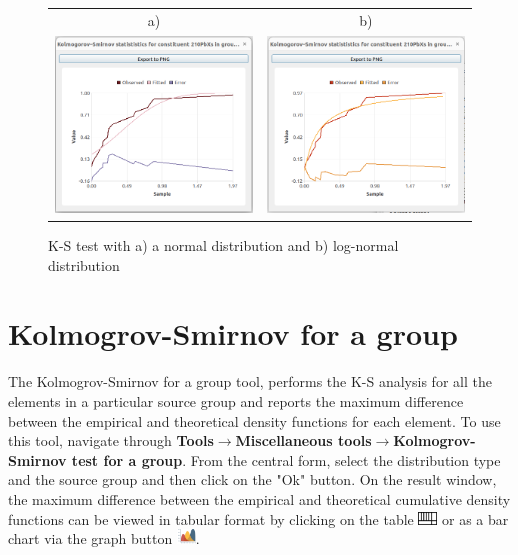 \documentclass[12pt]{report}
\begin{document}
\begin{figure}[ht]
    \centering
    \begin{tabular}{c c}
        a) & b) \\
        \includegraphics[width=8cm]{Figures/K-S-normal.png} & \includegraphics[width=8cm]{Figures/K-S-Lognormal.png}\\
    \end{tabular}
    \caption{K-S test with a) a normal distribution and b) log-normal distribution}
    \label{fig:K-S-test}
\end{figure}
\FloatBarrier


\section{Kolmogrov-Smirnov for a group}
The Kolmogrov-Smirnov for a group tool, performs the K-S analysis for all the elements in a particular source group and reports the maximum difference between the empirical and theoretical density functions for each element. To use this tool, navigate through \textbf{Tools}$\rightarrow$\textbf{Miscellaneous tools}$\rightarrow$\textbf{Kolmogrov-Smirnov test for a group}. From the central form, select the distribution type and the source group and then click on the "Ok" button. On the result window, the maximum difference between the empirical and theoretical cumulative density functions can be viewed in tabular format by clicking on the table \includegraphics[width=0.5cm]{Figures/table.png} or as a bar chart via the graph button \includegraphics[width=0.5cm]{Figures/Graph.png}. 
\end{document}
